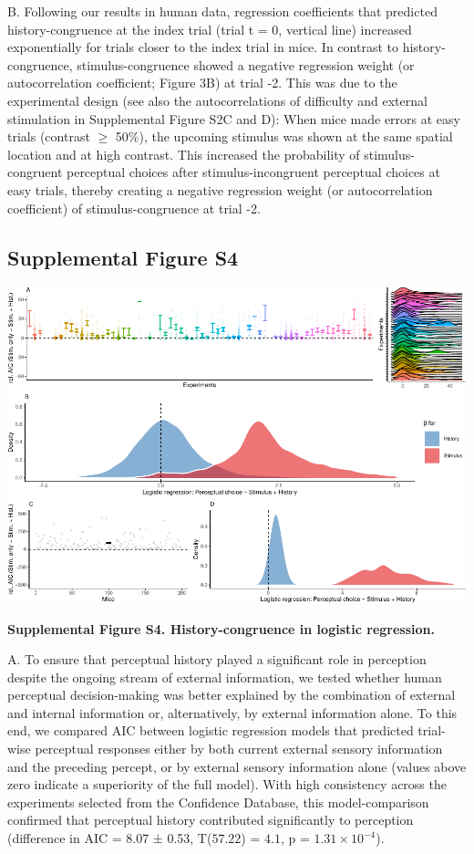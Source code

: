 \documentclass[
]{article}
\begin{document}
B. Following our results in human data, regression coefficients that
predicted history-congruence at the index trial (trial t = 0, vertical
line) increased exponentially for trials closer to the index trial in
mice. In contrast to history-congruence, stimulus-congruence showed a
negative regression weight (or autocorrelation coefficient; Figure 3B)
at trial -2. This was due to the experimental design (see also the
autocorrelations of difficulty and external stimulation in Supplemental
Figure S2C and D): When mice made errors at easy trials (contrast
\(\geq\) 50\%), the upcoming stimulus was shown at the same spatial
location and at high contrast. This increased the probability of
stimulus-congruent perceptual choices after stimulus-incongruent
perceptual choices at easy trials, thereby creating a negative
regression weight (or autocorrelation coefficient) of
stimulus-congruence at trial -2.

\newpage

\hypertarget{supplemental-figure-s4}{%
\subsection{Supplemental Figure S4}\label{supplemental-figure-s4}}

\includegraphics{modes_mouse_rev1b_files/figure-latex/Supplemental_Figure_S4-1.pdf}

\textbf{Supplemental Figure S4. History-congruence in logistic
regression.}

A. To ensure that perceptual history played a significant role in
perception despite the ongoing stream of external information, we tested
whether human perceptual decision-making was better explained by the
combination of external and internal information or, alternatively, by
external information alone. To this end, we compared AIC between
logistic regression models that predicted trial-wise perceptual
responses either by both current external sensory information and the
preceding percept, or by external sensory information alone (values
above zero indicate a superiority of the full model). With high
consistency across the experiments selected from the Confidence
Database, this model-comparison confirmed that perceptual history
contributed significantly to perception (difference in AIC = 8.07 ±
0.53, T(\(57.22\)) = \(4.1\), p = \(\ensuremath{1.31\times 10^{-4}}\)).
\end{document}

